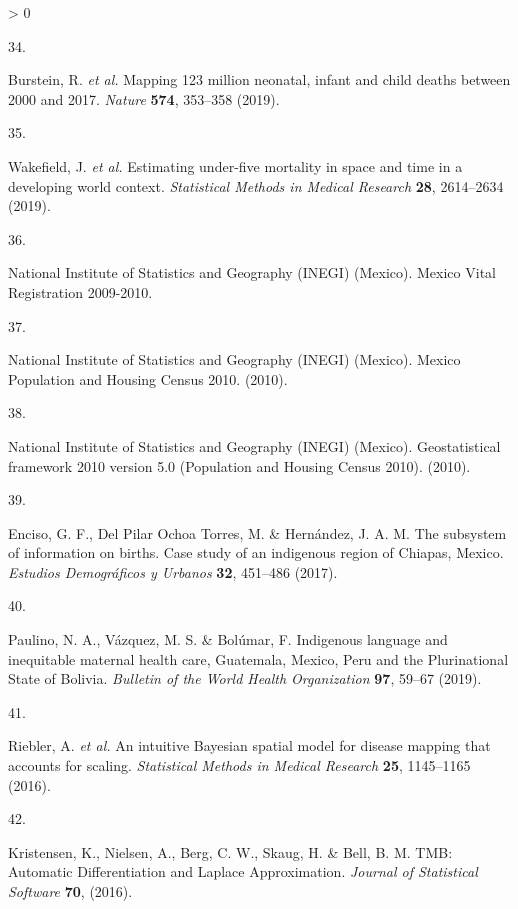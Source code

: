 \documentclass[
]{article}
\newlength{\cslhangindent}
\newlength{\csllabelwidth}
\newenvironment{CSLReferences}[2] %
 {%
  \setlength{\parindent}{0pt}
  \ifodd #1 \everypar{\setlength{\hangindent}{\cslhangindent}}\ignorespaces\fi
  \ifnum #2 > 0
  \setlength{\parskip}{#2\baselineskip}
  \fi
 }%
 {}
\newcommand{\CSLLeftMargin}[1]{\parbox[t]{\csllabelwidth}{#1}}
\newcommand{\CSLRightInline}[1]{\parbox[t]{\linewidth - \csllabelwidth}{#1}\break}
\begin{document}
\begin{CSLReferences}{0}{0}
\leavevmode\hypertarget{ref-Burstein2019}{}%
\CSLLeftMargin{34. }
\CSLRightInline{Burstein, R. \emph{et al.} {Mapping 123 million neonatal, infant and child deaths between 2000 and 2017}. \emph{Nature} \textbf{574}, 353--358 (2019).}

\leavevmode\hypertarget{ref-Wakefield2019}{}%
\CSLLeftMargin{35. }
\CSLRightInline{Wakefield, J. \emph{et al.} {Estimating under-five mortality in space and time in a developing world context}. \emph{Statistical Methods in Medical Research} \textbf{28}, 2614--2634 (2019).}

\leavevmode\hypertarget{ref-INEGI2010}{}%
\CSLLeftMargin{36. }
\CSLRightInline{National Institute of Statistics and Geography (INEGI) (Mexico). {Mexico Vital Registration 2009-2010}.}

\leavevmode\hypertarget{ref-INEGI2010a}{}%
\CSLLeftMargin{37. }
\CSLRightInline{National Institute of Statistics and Geography (INEGI) (Mexico). {Mexico Population and Housing Census 2010}. (2010).}

\leavevmode\hypertarget{ref-INEGI2010b}{}%
\CSLLeftMargin{38. }
\CSLRightInline{National Institute of Statistics and Geography (INEGI) (Mexico). {Geostatistical framework 2010 version 5.0 (Population and Housing Census 2010)}. (2010).}

\leavevmode\hypertarget{ref-Enciso2017}{}%
\CSLLeftMargin{39. }
\CSLRightInline{Enciso, G. F., Del Pilar Ochoa Torres, M. \& Hernández, J. A. M. {The subsystem of information on births. Case study of an indigenous region of Chiapas, Mexico}. \emph{Estudios Demogr{á}ficos y Urbanos} \textbf{32}, 451--486 (2017).}

\leavevmode\hypertarget{ref-Paulino2019}{}%
\CSLLeftMargin{40. }
\CSLRightInline{Paulino, N. A., Vázquez, M. S. \& Bolúmar, F. {Indigenous language and inequitable maternal health care, Guatemala, Mexico, Peru and the Plurinational State of Bolivia}. \emph{Bulletin of the World Health Organization} \textbf{97}, 59--67 (2019).}

\leavevmode\hypertarget{ref-Riebler2016}{}%
\CSLLeftMargin{41. }
\CSLRightInline{Riebler, A. \emph{et al.} {An intuitive Bayesian spatial model for disease mapping that accounts for scaling}. \emph{Statistical Methods in Medical Research} \textbf{25}, 1145--1165 (2016).}

\leavevmode\hypertarget{ref-Kristensen2016}{}%
\CSLLeftMargin{42. }
\CSLRightInline{Kristensen, K., Nielsen, A., Berg, C. W., Skaug, H. \& Bell, B. M. {TMB: Automatic Differentiation and Laplace Approximation}. \emph{Journal of Statistical Software} \textbf{70}, (2016).}


\end{CSLReferences}
\end{document}
